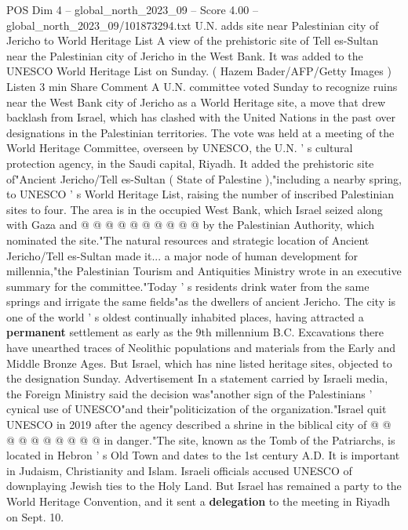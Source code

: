 \begin{textsample}{POS Dim 4 – global\_north\_2023\_09 – Score 4.00 – global\_north\_2023\_09/101873294.txt}  \label{ex:f4_pos_420}
U.N. adds site near Palestinian city of Jericho to World Heritage List A view of the prehistoric site of Tell es-Sultan near the Palestinian city of Jericho in the West Bank.
It was added to the UNESCO World Heritage List on Sunday. ( Hazem Bader/AFP/Getty Images ) Listen 3 min Share Comment A U.N. committee voted Sunday to recognize ruins near the West Bank city of Jericho as a World Heritage site, a move that drew backlash from Israel, which has clashed with the United Nations in the past over designations in the Palestinian territories.
The vote was held at a meeting of the World Heritage Committee, overseen by UNESCO, the U.N. ' s cultural protection agency, in the Saudi capital, Riyadh.
It added the prehistoric site of"Ancient Jericho/Tell es-Sultan ( State of Palestine ),"including a nearby spring, to UNESCO ' s World Heritage List, raising the number of inscribed Palestinian sites to four.
The area is in the occupied West Bank, which Israel seized along with Gaza and @ @ @ @ @ @ @ @ @ @ by the Palestinian Authority, which nominated the site."The natural resources and strategic location of Ancient Jericho/Tell es-Sultan made it... a major node of human development for millennia,"the Palestinian Tourism and Antiquities Ministry wrote in an executive summary for the committee."Today ' s residents drink water from the same springs and irrigate the same fields"as the dwellers of ancient Jericho.
The city is one of the world ' s oldest continually inhabited places, having attracted a \textbf{permanent} settlement as early as the 9th millennium B.C.
Excavations there have unearthed traces of Neolithic populations and materials from the Early and Middle Bronze Ages.
But Israel, which has nine listed heritage sites, objected to the designation Sunday.
Advertisement In a statement carried by Israeli media, the Foreign Ministry said the decision was"another sign of the Palestinians ' cynical use of UNESCO"and their"politicization of the organization."Israel quit UNESCO in 2019 after the agency described a shrine in the biblical city of @ @ @ @ @ @ @ @ @ @ in danger."The site, known as the Tomb of the Patriarchs, is located in Hebron ' s Old Town and dates to the 1st century A.D.
It is important in Judaism, Christianity and Islam.
Israeli officials accused UNESCO of downplaying Jewish ties to the Holy Land.
But Israel has remained a party to the World Heritage Convention, and it sent a \textbf{delegation} to the meeting in Riyadh on Sept. 10.

\end{textsample}
